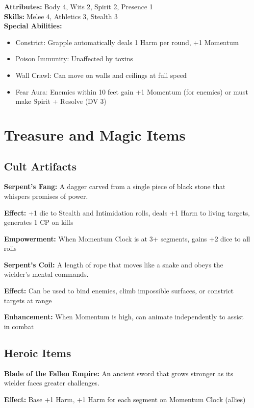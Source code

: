 \documentclass[12pt,twoside]{article}
\begin{document}
\textbf{Attributes:} Body 4, Wits 2, Spirit 2, Presence 1 \\
\textbf{Skills:} Melee 4, Athletics 3, Stealth 3 \\
\textbf{Special Abilities:}
\begin{itemize}
  \item Constrict: Grapple automatically deals 1 Harm per round, +1 Momentum
  \item Poison Immunity: Unaffected by toxins
  \item Wall Crawl: Can move on walls and ceilings at full speed
  \item Fear Aura: Enemies within 10 feet gain +1 Momentum (for enemies) or must make Spirit + Resolve (DV 3)
\end{itemize}

\section{Treasure and Magic Items}

\subsection{Cult Artifacts}

\textbf{Serpent's Fang:}
A dagger carved from a single piece of black stone that whispers promises of power.

\textbf{Effect:} +1 die to Stealth and Intimidation rolls, deals +1 Harm to living targets, generates 1 CP on kills

\textbf{Empowerment:} When Momentum Clock is at 3+ segments, gains +2 dice to all rolls

\textbf{Serpent's Coil:}
A length of rope that moves like a snake and obeys the wielder's mental commands.

\textbf{Effect:} Can be used to bind enemies, climb impossible surfaces, or constrict targets at range

\textbf{Enhancement:} When Momentum is high, can animate independently to assist in combat

\subsection{Heroic Items}

\textbf{Blade of the Fallen Empire:}
An ancient sword that grows stronger as its wielder faces greater challenges.

\textbf{Effect:} Base +1 Harm, +1 Harm for each segment on Momentum Clock (allies)
\end{document}
